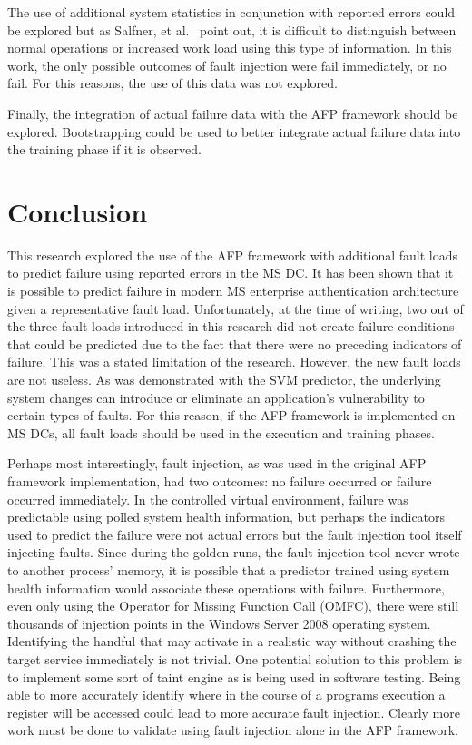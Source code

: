 The use of additional system statistics in conjunction with reported errors
could be explored but as Salfner, et al.~\cite{salfnerSurvey} point out, it is
difficult to distinguish between normal operations or increased work load using
this type of information.  In this work, the only possible outcomes of fault
injection were fail immediately, or no fail.  For this reasons, the use of this
data was not explored.

Finally, the integration of actual failure data with the \ac{AFP} framework
should be explored.  Bootstrapping could be used to better integrate actual
failure data into the training phase if it is observed. 

\section{Conclusion}
This research explored the use of the \ac{AFP} framework with additional fault
loads to predict failure using reported errors in the \ac{MS} \ac{DC}.  It has
been shown that it is possible to predict failure in modern \ac{MS} enterprise
authentication architecture given a representative fault load.  Unfortunately,
at the time of writing, two out of the three fault loads introduced in this
research did not create failure conditions that could be predicted due to the
fact that there were no preceding indicators of failure.  This was a stated
limitation of the research.  However, the new fault loads are not useless.  As
was demonstrated with the \ac{SVM} predictor, the underlying system changes can
introduce or eliminate an application's vulnerability to certain types of
faults.  For this reason, if the \ac{AFP} framework is implemented on \ac{MS}
\ac{DC}s, all fault loads should be used in the execution and training phases.

Perhaps most interestingly, fault injection, as was used in the original
\ac{AFP} framework implementation, had two outcomes: no failure occurred or
failure occurred immediately.  In the controlled virtual environment, failure
was predictable using polled system health information, but perhaps the
indicators used to predict the failure were not actual errors but the fault
injection tool itself injecting faults.  Since during the golden runs, the
fault injection tool never wrote to another process' memory, it is possible
that a predictor trained using system health information would associate these
operations with failure.  Furthermore, even only using the Operator for Missing
Function Call (OMFC), there were still thousands of injection points in the
Windows Server 2008 operating system.  Identifying the handful that may
activate in a realistic way without crashing the target service immediately is
not trivial.  One potential solution to this problem is to implement some sort
of taint engine as is being used in software testing.  Being able to more
accurately identify where in the course of a programs execution a register will
be accessed could lead to more accurate fault injection.  Clearly more work
must be done to validate using fault injection alone in the \ac{AFP} framework.

